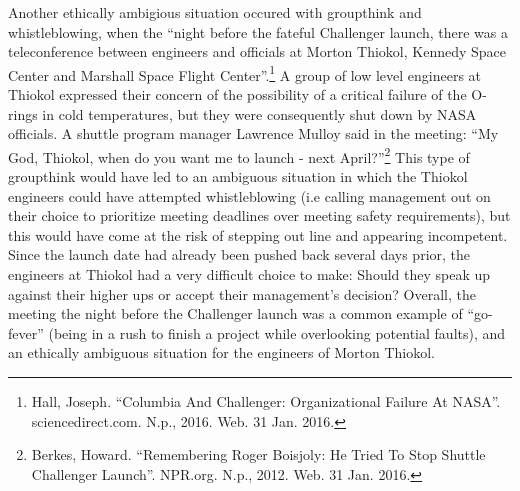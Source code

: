 \documentclass{article}
\newcommand{\q}[1]{``#1''}
\begin{document}
Another ethically ambigious situation occured with groupthink and whistleblowing, when the \q{night before the fateful Challenger launch, there was a teleconference between engineers and officials at Morton Thiokol, Kennedy Space Center and Marshall Space Flight Center}.\footnote{Hall, Joseph. \q{Columbia And Challenger: Organizational Failure At NASA}. sciencedirect.com. N.p., 2016. Web. 31 Jan. 2016.} A group of low level engineers at Thiokol expressed their concern of the possibility of a critical failure of the O-rings in cold temperatures, but they were consequently shut down by NASA officials. A shuttle program manager Lawrence Mulloy said in the meeting: \q{My God, Thiokol, when do you want me to launch - next April?}\footnote{Berkes, Howard. \q{Remembering Roger Boisjoly:  He Tried To Stop Shuttle Challenger Launch}. NPR.org. N.p., 2012. Web. 31 Jan. 2016.} This type of groupthink would have led to an ambiguous situation in which the Thiokol engineers could have attempted whistleblowing (i.e calling management out on their choice to prioritize meeting deadlines over meeting safety requirements), but this would have come at the risk of stepping out line and appearing incompetent. Since the launch date had already been pushed back several days prior, the engineers at Thiokol had a very difficult choice to make: Should they speak up against their higher ups or accept their management's decision? Overall, the meeting the night before the Challenger launch was a common example of \q{go-fever} (being in a rush to finish a project while overlooking potential faults), and an ethically ambiguous situation for the engineers of Morton Thiokol. 
\par
\end{document}
